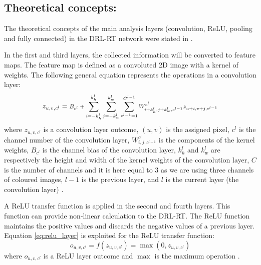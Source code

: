 \documentclass[conference]{IEEEtran}
\begin{document}
	\subsection{Theoretical concepts:} 
		The theoretical concepts of the main analysis layers (convolution, ReLU, pooling and fully connected) in the DRL-RT network were stated in \cite{omar2018deep}.
		
		In the first and third layers, the collected information will be converted to feature maps. The feature map is defined as a convoluted 2D image with a kernel of weights. The following general equation represents the operations in a convolution layer:
		\begin{equation}
			z_{u,v,c^{l}}= \text{\footnotesize $B_{c^{l}}+\sum_{i=-k_h^{l}}^{k_h^{l}}\sum_{j=-k_w^{l}}^{k_w^{l}}\sum_{c^{l-1}=1}^{C^{l-1}} W_{i+k_h^{l},j+k_w^{l},c^{l-1}}^{c^{l}} z_{u+i,v+j,c^{l-1}}$}
		\label{eq:conv_layer}
		\end{equation}
		where $z_{u,v,c^{l}}$ is a convolution layer outcome, $(u,v)$ is the assigned pixel, $c^{l}$ is the channel number of the convolution layer,  $W_{i,j,c^{l-1}}^{c^{l}}$ is the components of the kernel weights,  $B_{c^{l}}$ is the channel bias of the convolution layer, $k_h^l$ and $k_w^l$ are respectively the height and width of the kernel weights of the convolution layer, $C$ is the number of channels and it is here equal to 3 as we are using three channels of coloured images, $l-1$ is the previous layer, and $l$ is the current layer (the convolution layer) \cite{simo2016learning}. 
	
		A ReLU transfer function is applied in the second and fourth layers. This function can provide non-linear calculation to the DRL-RT. The ReLU function maintains the positive values and discards the negative values of a previous layer. Equation \eqref{eq:relu_layer} is exploited for the ReLU transfer function:
		\begin{equation}
			o_{u,v,c^{l}}=f(z_{u,v,c^{l}})=\max(0,z_{u,v,c^{l}})
		\label{eq:relu_layer}
		\end{equation}
		where $o_{u,v,c^{l}}$ is a ReLU layer outcome and $\max$ is the maximum operation \cite{krizhevsky2012imagenet}. 
	
\end{document}
